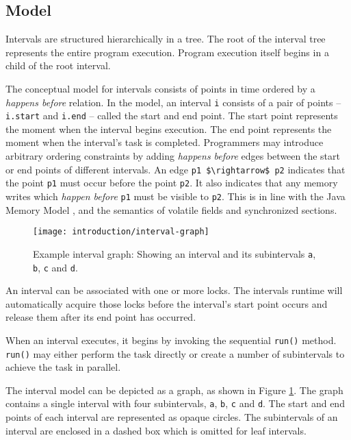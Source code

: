\subsection{Model}
\label{sec:intro-intervals-model}

Intervals are structured hierarchically in a tree. The root of the
interval tree represents the entire program execution. Program
execution itself begins in a child of the root interval.

The conceptual model for intervals consists of points in time ordered
by a \emph{happens before} relation. In the model, an interval
\lstinline!i! consists of a pair of points -- \lstinline!i.start! and
\lstinline!i.end! -- called the start and end point. The start point
represents the moment when the interval begins execution. The end
point represents the moment when the interval's task is
completed. Programmers may introduce arbitrary ordering constraints by
adding \emph{happens before} edges between the start or end points of
different intervals. An edge \lstinline!p1 $\rightarrow$ p2! indicates
that the point \lstinline!p1! must occur before the point
\lstinline!p2!. It also indicates that any memory writes which
\emph{happen before} \lstinline!p1! must be visible to
\lstinline!p2!. This is in line with the Java Memory Model
\cite{Manson2005}, and the semantics of volatile fields and
synchronized sections.

\begin{figure}[htb]
  \centering
  \texttt{[image: introduction/interval-graph]}
  \caption[Example interval graph]{Example interval graph: Showing an
    interval and its subintervals \lstinline!a!, \lstinline!b!,
    \lstinline!c! and \lstinline!d!.}
  \label{fig:introduction-interval-graph}
\end{figure}

An interval can be associated with one or more locks. The intervals
runtime will automatically acquire those locks before the interval's
start point occurs and release them after its end point has occurred.

When an interval executes, it begins by invoking the sequential
\lstinline!run()! method. \lstinline!run()! may either perform the
task directly or create a number of subintervals to achieve the task
in parallel.

The interval model can be depicted as a graph, as shown in Figure
\ref{fig:introduction-interval-graph}. The graph contains a single interval with
four subintervals, \lstinline!a!, \lstinline!b!, \lstinline!c! and
\lstinline!d!. The start and end points of each interval are
represented as opaque circles. The subintervals of an interval are
enclosed in a dashed box which is omitted for leaf intervals.

